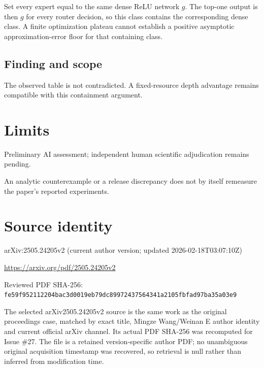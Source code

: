 \documentclass[11pt]{article}
\begin{document}
Set every expert equal to the same dense ReLU network \(g\). The top-one output is then \(g\) for every router decision, so this class contains the corresponding dense class. A finite optimization plateau cannot establish a positive asymptotic approximation-error floor for that containing class.

\subsection*{Finding and scope}

The observed table is not contradicted. A fixed-resource depth advantage remains compatible with this containment argument.

\section*{Limits}

Preliminary AI assessment; independent human scientific adjudication remains pending.\par

An analytic counterexample or a release discrepancy does not by itself remeasure the paper’s reported experiments.\par

\section*{Source identity}

arXiv:2505.24205v2 (current author version; updated 2026-02-18T03:07:10Z)

\url{https://arxiv.org/pdf/2505.24205v2}

Reviewed PDF SHA-256: \nolinkurl{fe59f952112204bac3d0019eb79dc89972437564341a2105fbfad97ba35a03e9}

The selected arXiv2505.24205v2 source is the same work as the original proceedings case, matched by exact title, Mingze Wang/Weinan E author identity and current official arXiv channel. Its actual PDF SHA-256 was recomputed for Issue \#27. The file is a retained version-specific author PDF; no unambiguous original acquisition timestamp was recovered, so retrieval is null rather than inferred from modification time.
\end{document}
